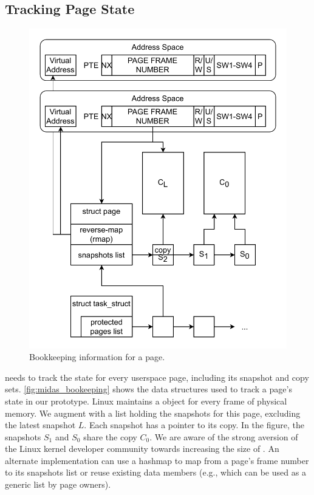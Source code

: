 \subsection{Tracking Page State}

\begin{figure}[]
  \centering
  \includegraphics[width=\linewidth]{media/midas/book-keeping.pdf}
  \caption{Bookkeeping information for a page.}
  \label{fig:midas_bookeeping}
\end{figure}

\midas needs to track the state for every userspace page, including
its snapshot and copy sets.
\autoref{fig:midas_bookeeping} shows the data structures used to
track a page's state in our prototype.
Linux maintains a  object for every frame of
physical memory.
We augment   with a list holding the snapshots
for this page, excluding the latest snapshot $L$.
Each snapshot has a pointer to its copy.
In the figure, the snapshots $S_1$ and $S_0$ share the copy $C_0$.
We are aware of the strong aversion of the
Linux kernel developer community towards increasing the size of
.
An alternate implementation can use a hashmap to
map from a page's frame number to its snapshots list or
reuse existing data members (e.g.,  which
can be used as a generic list by page owners).

